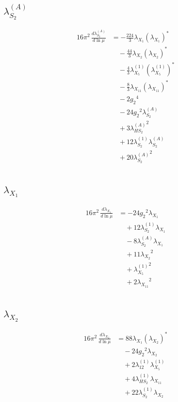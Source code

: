 \documentclass[10pt,a4paper]{article}
\begin{document}
\subsection*{$\lambda_{S_2}^{(A)}$}
\begin{align*}
16\pi^2\,\frac{d \lambda_{S_2}^{(A)}}{d\ln\mu} &=-\frac{224}{3} {\lambda_{X_{1}}} \left({\lambda_{X_{1}}}\right)^{*} \\
&\quad -\frac{44}{3} {\lambda_{X_{2}}} \left({\lambda_{X_{2}}}\right)^{*} \\
&\quad -\frac{4}{3} {\lambda_{X_{5}}^{(1)}} \left({\lambda_{X_{5}}^{(1)}}\right)^{*} \\
&\quad -\frac{8}{3} {\lambda_{X_{11}}} \left({\lambda_{X_{11}}}\right)^{*} \\
&\quad -2 {g_2}^4 \\
&\quad -24 {g_2}^2 {\lambda_{S_2}^{(A)}} \\
&\quad +3 {\lambda_{HS_2}^{(A)}}^2 \\
&\quad +12 {\lambda_{S_2}^{(1)}} {\lambda_{S_2}^{(A)}} \\
&\quad +20 {\lambda_{S_2}^{(A)}}^2 \\
\end{align*}
\subsection*{$\lambda_{X_{1}}$}
\begin{align*}
16\pi^2\,\frac{d \lambda_{X_{1}}}{d\ln\mu} &=-24 {g_2}^2 {\lambda_{X_{1}}} \\
&\quad +12 {\lambda_{S_2}^{(1)}} {\lambda_{X_{1}}} \\
&\quad -8 {\lambda_{S_2}^{(A)}} {\lambda_{X_{1}}} \\
&\quad +11 {\lambda_{X_{2}}}^2 \\
&\quad +{\lambda_{X_{5}}^{(1)}}^2 \\
&\quad +2 {\lambda_{X_{11}}}^2 \\
\end{align*}
\subsection*{$\lambda_{X_{2}}$}
\begin{align*}
16\pi^2\,\frac{d \lambda_{X_{2}}}{d\ln\mu} &=88 {\lambda_{X_{1}}} \left({\lambda_{X_{2}}}\right)^{*} \\
&\quad -24 {g_2}^2 {\lambda_{X_{2}}} \\
&\quad +2 {\lambda_{12}^{(1)}} {\lambda_{X_{5}}^{(1)}} \\
&\quad +4 {\lambda_{HS_2}^{(1)}} {\lambda_{X_{11}}} \\
&\quad +22 {\lambda_{S_2}^{(1)}} {\lambda_{X_{2}}} \\
\end{align*}
\end{document}
